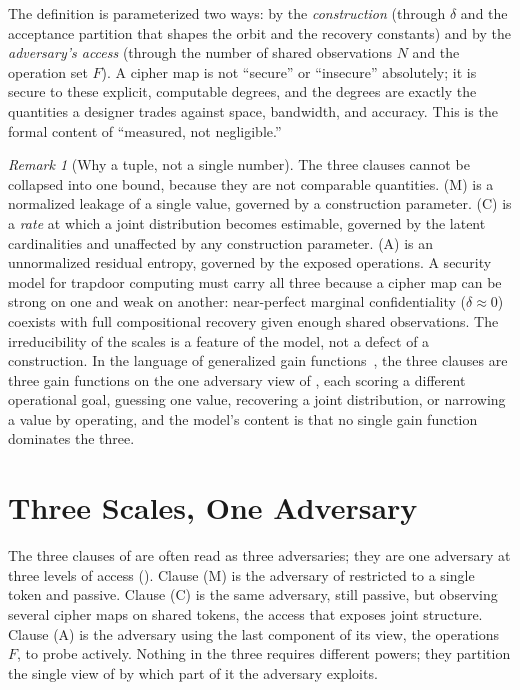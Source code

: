 \documentclass[11pt]{article}
\theoremstyle{definition}
\theoremstyle{plain}
\theoremstyle{remark}
\newtheorem{remark}{Remark}
\begin{document}
The definition is parameterized two ways: by the \emph{construction} (through
$\delta$ and the acceptance partition that shapes the orbit and the recovery
constants) and by the \emph{adversary's access} (through the number of shared
observations $N$ and the operation set $F$). A cipher map is not ``secure'' or
``insecure'' absolutely; it is secure to these explicit, computable degrees, and
the degrees are exactly the quantities a designer trades against space,
bandwidth, and accuracy. This is the formal content of ``measured, not
negligible.''

\begin{remark}[Why a tuple, not a single number]
\label{rem:tuple}
The three clauses cannot be collapsed into one bound, because they are not
comparable quantities. (M) is a normalized leakage of a single value, governed
by a construction parameter. (C) is a \emph{rate} at which a joint distribution
becomes estimable, governed by the latent cardinalities and unaffected by any
construction parameter. (A) is an unnormalized residual entropy, governed by the
exposed operations. A security model for trapdoor computing must carry all three
because a cipher map can be strong on one and weak on another: near-perfect
marginal confidentiality ($\delta \approx 0$) coexists with full compositional
recovery given enough shared observations. The irreducibility of the scales is
a feature of the model, not a defect of a construction. In the language of
generalized gain functions~\cite{alvim2012gleakage}, the three clauses are three
gain functions on the one adversary view of , each scoring a
different operational goal, guessing one value, recovering a joint distribution,
or narrowing a value by operating, and the model's content is that no single
gain function dominates the three.
\end{remark}

\section{Three Scales, One Adversary}
\label{sec:scales}

The three clauses of  are often read as three
adversaries; they are one adversary at three levels of access ().
Clause (M) is the adversary of  restricted to a single token and
passive. Clause (C) is the same adversary, still passive, but observing several
cipher maps on shared tokens, the access that exposes joint structure. Clause
(A) is the adversary using the last component of its view, the operations $F$,
to probe actively. Nothing in the three requires different powers; they
partition the single view of  by which part of it the adversary
exploits.
\end{document}
